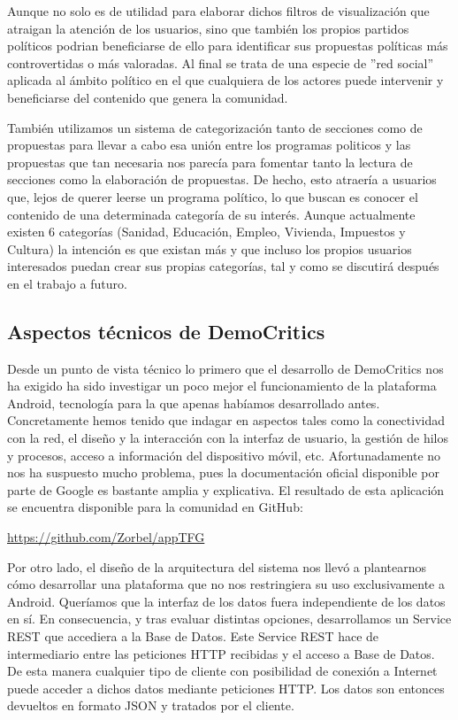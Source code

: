Aunque no solo es de utilidad para elaborar dichos filtros de visualización que atraigan la atención de los usuarios, sino que también los propios partidos políticos podrian beneficiarse de ello para identificar sus propuestas políticas más controvertidas o más valoradas. Al final se trata de una especie de ''red social'' aplicada al ámbito político en el que cualquiera de los actores puede intervenir y beneficiarse del contenido que genera la comunidad. 

También utilizamos un sistema de categorización tanto de secciones como de propuestas para llevar a cabo esa unión entre los programas politicos y las propuestas que tan necesaria nos parecía para fomentar tanto la lectura de secciones como la elaboración de propuestas. De hecho, esto atraería a usuarios que, lejos de querer leerse un programa político, lo que buscan es conocer el contenido de una determinada categoría de su interés. Aunque actualmente existen 6 categorías (Sanidad, Educación, Empleo, Vivienda, Impuestos y Cultura) la intención es que existan más y que incluso los propios usuarios interesados puedan crear sus propias categorías, tal y como se discutirá después en el trabajo a futuro. 

\subsection{Aspectos técnicos de DemoCritics}

Desde un punto de vista técnico lo primero que el desarrollo de DemoCritics nos ha exigido ha sido investigar un poco mejor el funcionamiento de la plataforma Android, tecnología para la que apenas habíamos desarrollado antes. Concretamente hemos tenido que indagar en aspectos tales como la conectividad con la red, el diseño y la interacción con la interfaz de usuario, la gestión de hilos y procesos, acceso a información del dispositivo móvil, etc. Afortunadamente no nos ha suspuesto mucho problema, pues la documentación oficial disponible por parte de Google es bastante amplia y explicativa. El resultado de esta aplicación se encuentra disponible para la comunidad en GitHub:

\url{https://github.com/Zorbel/appTFG}

Por otro lado, el diseño de la arquitectura del sistema nos llevó a plantearnos cómo desarrollar una plataforma que no nos restringiera su uso exclusivamente a Android. Queríamos que la interfaz de los datos fuera independiente de los datos en sí. En consecuencia, y tras evaluar distintas opciones, desarrollamos un Service REST que accediera a la Base de Datos. Este Service REST hace de intermediario entre las peticiones HTTP recibidas y el acceso a Base de Datos. De esta manera cualquier tipo de cliente con posibilidad de conexión a Internet puede acceder a dichos datos mediante peticiones HTTP. Los datos son entonces devueltos en formato JSON y tratados por el cliente.

